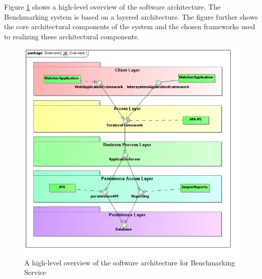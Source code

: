 Figure \ref{ref:softwareArchitecture} shows a high-level overview of the 
software architecture. The Benchmarking system is based on a layered 
architecture. The figure further shows the core architectural components of
the system and the chosen frameworks used to realizing these architectural components.

\begin{figure}[H]
  \begin{center}
  \includegraphics[scale=0.4]{../Diagrams and Charts/Overview/Overview.jpg}
  \caption{A high-level overview of the software architecture for Benchmarking Service}
  \end{center}
  \label{ref:softwareArchitecture}
\end{figure}

